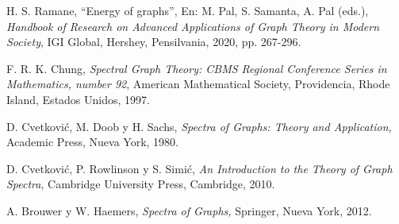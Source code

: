 \begin{thebibliography}{99}
{%
\vspace{-0.1cm}
 H. S. Ramane, \textquotedblleft Energy of graphs\textquotedblright, En: M. Pal, S. Samanta, A. Pal (eds.), \emph{Handbook of Research on Advanced Applications of Graph Theory in
Modern Society}, IGI Global, Hershey, Pensilvania, 2020, pp. 267-296.


\vspace{-0.1cm}
 F. R. K. Chung, \emph{Spectral Graph Theory: CBMS Regional Conference Series in Mathematics, number 92}, American Mathematical Society, Providencia, Rhode Island, Estados Unidos, 1997.



\vspace{-0.1cm}
 D. Cvetkovi\'{c}, M. Doob y H. Sachs, \emph{Spectra of Graphs: Theory and Application,} Academic Press, Nueva York, 1980.

\vspace{-0.1cm}
 D. Cvetkovi\'{c}, P. Rowlinson y S. Simi\'{c}, \emph{An
Introduction to the Theory of Graph Spectra}, Cambridge University Press, Cambridge,
2010.


\vspace{-0.1cm}
 A. Brouwer y W. Haemers, \emph{Spectra of Graphs,} Springer, Nueva York, 2012.


}
\end{thebibliography}
